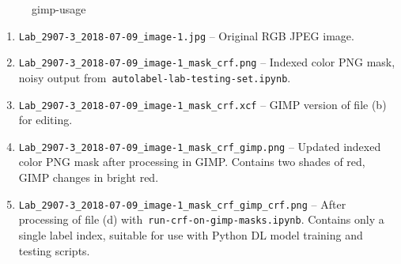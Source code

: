 \documentclass[11pt]{article} %
\begin{document}
\begin{enumerate}
\begin{figure}
\centering
{}
\caption{gimp-usage}
\label{fig:gimp-export-menu}
\end{figure}

\begin{enumerate}
\item \texttt{Lab\_2907-3\_2018-07-09\_image-1.jpg} -- Original RGB JPEG image.
\item \texttt{Lab\_2907-3\_2018-07-09\_image-1\_mask\_crf.png} -- Indexed color 
PNG mask, noisy output from~\texttt{autolabel-lab-testing-set.ipynb}.
\item \texttt{Lab\_2907-3\_2018-07-09\_image-1\_mask\_crf.xcf} -- GIMP version 
of file (b) for editing.
\item \texttt{Lab\_2907-3\_2018-07-09\_image-1\_mask\_crf\_gimp.png} -- Updated 
indexed color PNG mask after processing in GIMP. Contains two shades of red, 
GIMP changes in bright red.
\item \texttt{Lab\_2907-3\_2018-07-09\_image-1\_mask\_crf\_gimp\_crf.png} -- 
After processing of file (d) with~\texttt{run-crf-on-gimp-masks.ipynb}. Contains
only a single label index, suitable for use with Python DL model training and
testing scripts.

\end{enumerate}

\end{enumerate}
\end{document}
